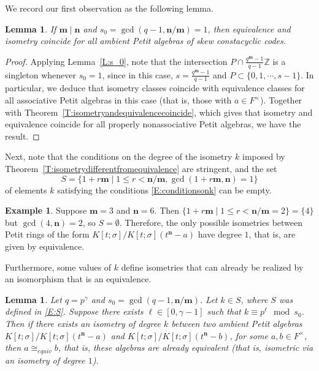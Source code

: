 \documentclass[11pt]{amsart}
\theoremstyle{plain}
\newtheorem{lemma}[theorem]{Lemma}
\theoremstyle{definition}
\newtheorem{example}[theorem]{Example}
\numberwithin{equation}{section}
\numberwithin{figure}{section}
\newcommand{\ZZ}{\mathbb{Z}}
\newcommand{\Kone}[1]{K[t;\sigma]/K[t;\sigma](t^{\de}-#1)}
\newcommand{\os}{{\mathbf{m}}}  %
\newcommand{\de}{{\mathbf{n}}}  %
\begin{document}
We record our first observation as the following lemma.


\begin{lemma}\label{le:s}
If $\os\mid\de$ and $s_0=\gcd(q-1,\de/\os)=1$, %
then equivalence and isometry coincide for all ambient Petit algebras of skew constacyclic codes.
\end{lemma}

\begin{proof}
    Applying Lemma~\ref{L:s_0}, note that the intersection $P \cap \frac{q^\os-1}{q-1}\ZZ$ is a singleton whenever $s_0=1$, since in this case, $s=\frac{q^\os-1}{q-1}$ and $P\subset \{0,1,\cdots,s-1\}$.  In particular, we deduce that isometry classes coincide with equivalence classes for all associative Petit algebras in this case (that is, those with $a\in F^\times$). Together with Theorem~\ref{T:isometryandequivalencecoincide}, which gives that  isometry and equivalence coincide for all properly nonassociative Petit algebras, we have the result.
\end{proof}


Next, note that the conditions on the degree of the isometry $k$ imposed by Theorem~\ref{T:isometrydifferentfromequivalence} are stringent, and the set
\begin{equation}\label{E:S}
S = \{ 1+r\os \mid 1\leq r < \de/\os, \gcd(1+r\os,\de)=1\}
\end{equation}
of elements $k$ satisfying the conditions \eqref{E:conditionsonk}
can be empty.


\begin{example}
    Suppose $\os=3$ and $\de=6$. Then $\{1+r\os\mid 1\leq r < \de/\os=2\} = \{4\}$ but $\gcd(4,\de)=2$, so $S=\emptyset$.  Therefore, the only possible isometries between Petit rings of the form $\Kone{a}$ have degree $1$, that is, are given by equivalence.
\end{example}

Furthermore, some values of $k$ define isometries that can already be realized by an isomorphism that is an equivalence.

\begin{lemma}\label{L:nonewisometries}
    Let $q=p^\gamma$ and $s_0=\gcd(q-1,\de/\os)$. Let $k\in S$, where $S$ was defined in \eqref{E:S}.  Suppose there exists $\ell \in [0,\gamma-1]$ such that $k\equiv p^\ell\mod s_0$.  Then if there exists an isometry of degree $k$ between two ambient Petit algebras $\Kone{a}$ and $\Kone{b}$, for some $a,b\in F^\times$, then $a\cong_{equiv}b$, that is, these algebras are already equivalent (that is, isometric via an isometry of degree $1$).
\end{lemma}
\end{document}
